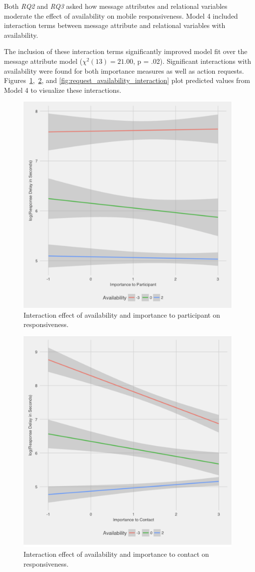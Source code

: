 \documentclass[12pt]{nuthesis}	%
\begin{document}
Both \textit{RQ2} and \textit{RQ3} asked how message attributes and relational variables moderate the effect of availability on mobile responsiveness. Model 4 included interaction terms between message attribute and relational variables with availability.

The inclusion of these interaction terms significantly improved model fit over the message attribute model ($\chi^2(13) = 21.00$, p = .02). Significant interactions with availability were found for both importance measures as well as action requests. Figures~\ref{fig:importance_availability_interaction},~\ref{fig:importance_contact_availability_interaction}, and \ref{fig:request_availability_interaction} plot predicted values from Model 4 to visualize these interactions.

\begin{figure}[h]
\centering
\includegraphics[width=.7\textwidth]{figures/importance_availability_interaction}
\caption{Interaction effect of availability and importance to participant on responsiveness.}
\label{fig:importance_availability_interaction}
\end{figure}

\begin{figure}[h]
\centering
\includegraphics[width=.7\textwidth]{figures/importance_contact_availability_interaction}
\caption{Interaction effect of availability and importance to contact on responsiveness.}
\label{fig:importance_contact_availability_interaction}
\end{figure}
\end{document}
